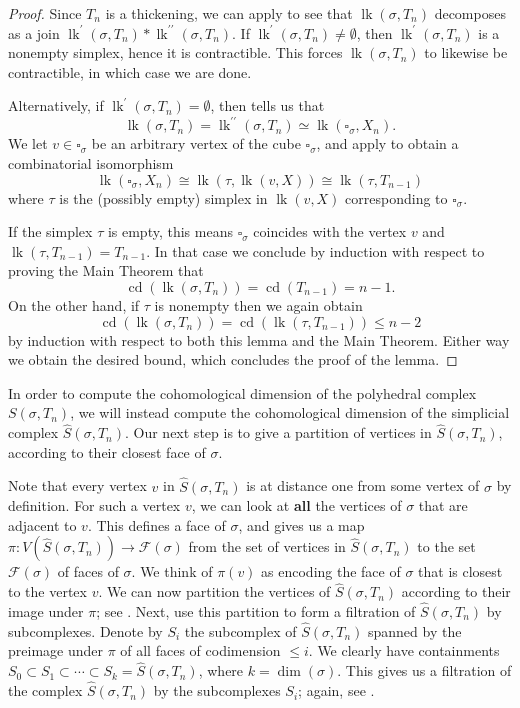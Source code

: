 \documentclass[12pt, letterpaper]{article}
\newcommand{\lk}{\operatorname{lk}}
\newcommand{\cdim}{\operatorname{cd}}
\theoremstyle{plain}
\theoremstyle{definition}
\begin{document}
\begin{proof}
Since $T_n$ is a thickening, we can apply  to see that $\lk(\sigma, T_n)$ decomposes as a join $\lk^\prime(\sigma, T_n)*\lk^{\prime\prime}(\sigma, T_n)$. If $\lk^\prime(\sigma, T_n)\neq \emptyset$, then $\lk^\prime(\sigma, T_n)$ is a nonempty simplex, hence it is contractible. This forces $\lk(\sigma, T_n)$ to likewise be contractible, in which case we are done.

Alternatively, if $\lk^\prime(\sigma, T_n)= \emptyset$, then  tells us that
    \[ \lk(\sigma, T_n) = \lk^{\prime\prime}(\sigma, T_n) \simeq \lk(\square_\sigma, X_n). \]
We let $v\in \square_\sigma$ be an arbitrary vertex of the cube $\square_\sigma$, and apply  to obtain a combinatorial isomorphism
    \[ \lk(\square_\sigma, X_n) \cong \lk(\tau, \lk(v,X)) \cong \lk(\tau, T_{n-1}) \]
where $\tau$ is the (possibly empty) simplex in $\lk(v,X)$ corresponding to $\square_\sigma$.

If the simplex $\tau$ is empty, this means $\square_\sigma$ coincides with the vertex $v$ and $\lk(\tau, T_{n-1}) = T_{n-1}$. In that case we conclude by induction with respect to proving the Main Theorem that
    \[ \cdim(\lk(\sigma, T_n)) = \cdim(T_{n-1}) = n-1. \]
On the other hand, if $\tau$ is nonempty then we again obtain
    \[ \cdim(\lk(\sigma, T_n)) = \cdim(\lk(\tau,T_{n-1})) \leq n-2 \]
by induction with respect to both this lemma and the Main Theorem. Either way we obtain the desired bound, which concludes the proof of the lemma.
\end{proof}

In order to compute the cohomological dimension of the polyhedral complex $S(\sigma, T_n)$, we will instead compute the cohomological dimension of the simplicial complex $\hat S(\sigma, T_n)$. Our next step is to give a partition of vertices in $\hat S(\sigma, T_n)$, according to their closest face of $\sigma$.

\medskip

Note that every vertex $v$ in $\hat S(\sigma, T_n)$ is at distance one from some vertex of $\sigma$ by definition. For such a vertex $v$, we can look at \textbf{all} the vertices of $\sigma$ that are adjacent to $v$. This defines a face of $\sigma$, and gives us a map $\pi \colon V(\hat S(\sigma, T_n)) \rightarrow \mathcal F(\sigma)$ from the set of vertices in $\hat S(\sigma, T_n)$ to the set $\mathcal F(\sigma)$ of faces of $\sigma$. We think of $\pi(v)$ as encoding the face of $\sigma$ that is closest to the vertex $v$. We can now partition the vertices of $\hat S(\sigma, T_n)$ according to their image under $\pi$; see . Next, use this partition to form a filtration of $\hat S(\sigma, T_n)$ by subcomplexes. Denote by $S_i$ the subcomplex of $\hat S(\sigma, T_n)$ spanned by the preimage under $\pi$ of all faces of codimension $\leq i$. We clearly have containments $S_0 \subset S_1 \subset \cdots \subset S_k = \hat S(\sigma, T_n)$, where $k=\dim(\sigma)$. This gives us a filtration of the complex $\hat S(\sigma, T_n)$ by the subcomplexes $S_i$; again, see .
\end{document}
